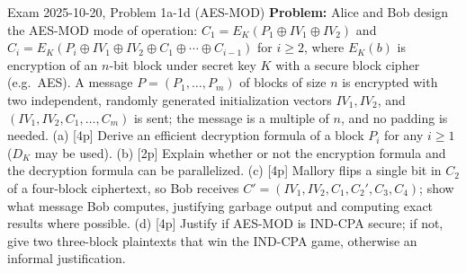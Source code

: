 \documentclass[12pt, a4paper]{article}
\begin{document}
\begin{practicebox}{Exam 2025-10-20, Problem 1a-1d (AES-MOD)}
\textbf{Problem:} Alice and Bob design the AES-MOD mode of operation: $C_1 = E_K(P_1 \oplus IV_1 \oplus IV_2)$ and $C_i = E_K(P_i \oplus IV_1 \oplus IV_2 \oplus C_1 \oplus \cdots \oplus C_{i-1})$ for $i \geq 2$, where $E_K(b)$ is encryption of an $n$-bit block under secret key $K$ with a secure block cipher (e.g.\ AES). A message $P = (P_1, \dots, P_m)$ of blocks of size $n$ is encrypted with two independent, randomly generated initialization vectors $IV_1, IV_2$, and $(IV_1, IV_2, C_1, \dots, C_m)$ is sent; the message is a multiple of $n$, and no padding is needed. (a) [4p] Derive an efficient decryption formula of a block $P_i$ for any $i \geq 1$ ($D_K$ may be used). (b) [2p] Explain whether or not the encryption formula and the decryption formula can be parallelized. (c) [4p] Mallory flips a single bit in $C_2$ of a four-block ciphertext, so Bob receives $C' = (IV_1, IV_2, C_1, C_2', C_3, C_4)$; show what message Bob computes, justifying garbage output and computing exact results where possible. (d) [4p] Justify if AES-MOD is IND-CPA secure; if not, give two three-block plaintexts that win the IND-CPA game, otherwise an informal justification.


\end{practicebox}
\end{document}
